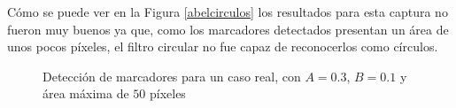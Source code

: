 Cómo se puede ver en la Figura \ref{abelcirculos} los resultados para esta captura no fueron muy buenos ya que, como los marcadores detectados presentan un área de unos pocos píxeles, el filtro circular no fue capaz de reconocerlos como círculos.  

\begin{figure}[ht!]
         \hspace{-1cm}
        \hspace{1 mm}
  \caption{Detección de marcadores para un caso real, con $A=0.3$, $B=0.1$ y área máxima de $50$ píxeles}
      \label{ejemploabeldet}
\end{figure}

